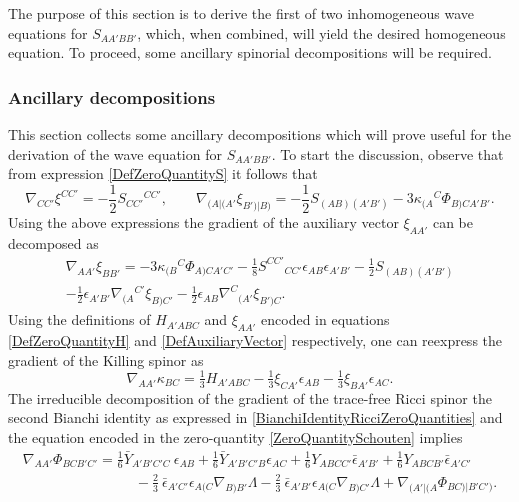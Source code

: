 \documentclass[10pt,a4paper]{article}
\theoremstyle{plain}
\begin{document}
The purpose of this section is to derive the first of two inhomogeneous
 wave equations for $S_{AA'BB'}$, which, when combined, will yield the
  desired homogeneous equation. To proceed, some ancillary spinorial 
  decompositions will be required.
   

\subsubsection{Ancillary decompositions}
\label{AnciliaryResults}
This section collects some ancillary decompositions which
will prove useful for the
derivation of the wave equation for $S_{AA'BB'}$. To start the
discussion, observe that from expression \eqref{DefZeroQuantityS} it
follows that
\begin{equation}\label{DivergenceXiIntermsofS}
\nabla_{CC'}\xi^{CC'}=-\frac{1}{2}S_{CC'}{}^{CC'}, \qquad
\nabla_{(A|(A'}\xi_{B')|B)}=-\frac{1}{2}S_{(AB)(A'B')}-3\kappa_{(A}{}^{C}\Phi_{B)CA'B'}.
\end{equation}
Using the above expressions the gradient of the auxiliary vector
$\xi_{AA'}$ can be decomposed as
\begin{multline}\label{SymmetrisedDerivativesXi}
\nabla_{AA'}\xi_{BB'}= -3\kappa_{(B}{}^{C}\Phi_{A)CA'C'}
-\frac{1}{8}S^{CC'}{}_{CC'}\epsilon_{AB}\epsilon_{A'B'}-\frac{1}{2}S_{(AB)(A'B')}
\\ -
\frac{1}{2}\epsilon_{A'B'}\nabla_{(A}{}^{C'}\xi_{B)C'}-\frac{1}{2}\epsilon_{AB}\nabla^{C}{}_{(A'}\xi_{B')C}.
\end{multline}
Using the definitions of $H_{A'ABC}$ and $\xi_{AA'}$ encoded in
equations \eqref{DefZeroQuantityH} and \eqref{DefAuxiliaryVector}
respectively, one can reexpress the gradient of the Killing spinor as
\begin{equation}\label{eq:decompositionDKappaAlt}
\nabla_{AA'}\kappa_{BC} = \tfrac{1}{3} H_{A'ABC} - \tfrac{1}{3}
\xi_{CA'} \epsilon_{AB} - \tfrac{1}{3} \xi_{BA'} \epsilon_{AC}.
\end{equation}
The irreducible decomposition of the gradient of the trace-free Ricci
spinor the second Bianchi identity as expressed in
\eqref{BianchiIdentityRicciZeroQuantities} and the equation encoded in
the zero-quantity \eqref{ZeroQuantitySchouten} implies
\begin{multline}
\nabla_{AA'}\Phi_{BCB'C'} = \tfrac{1}{6} \bar{Y}_{A'B'C'C}
\ \epsilon_{AB} + \tfrac{1}{6} \bar{Y}_{A'B'C'B} \epsilon_{AC} +
\tfrac{1}{6} Y_{ABCC'} \bar{\epsilon}_{A'B'} + \tfrac{1}{6} Y_{ABCB'}
\bar{\epsilon}_{A'C'} \\ \qquad \qquad \qquad \qquad - \tfrac{2}{3}
\ \bar{\epsilon}_{A'C'} \epsilon_{A(C}\nabla_{B)B'}\Lambda -
\tfrac{2}{3} \ \bar{\epsilon}_{A'B'}
\epsilon_{A(C}\nabla_{B)C'}\Lambda + \nabla_{(A'|(A}\Phi_{BC)|B'C')}.
\end{multline}
\end{document}
